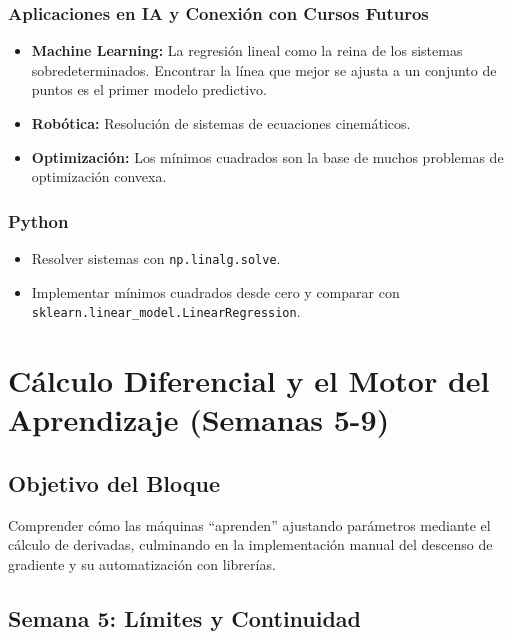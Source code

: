 \documentclass[12pt,a4paper,openany,oneside]{book}
\begin{document}
\subsection{Aplicaciones en IA y Conexión con Cursos Futuros}
\begin{itemize}
    \item \textbf{Machine Learning:} La regresión lineal como la reina de los sistemas sobredeterminados. Encontrar la línea que mejor se ajusta a un conjunto de puntos es el primer modelo predictivo.
    \item \textbf{Robótica:} Resolución de sistemas de ecuaciones cinemáticos.
    \item \textbf{Optimización:} Los mínimos cuadrados son la base de muchos problemas de optimización convexa.
\end{itemize}

\subsection{Python}
\begin{itemize}
    \item Resolver sistemas con \texttt{np.linalg.solve}.
    \item Implementar mínimos cuadrados desde cero y comparar con \texttt{sklearn.linear\_model.LinearRegression}.
\end{itemize}

\chapter{Cálculo Diferencial y el Motor del Aprendizaje (Semanas 5-9)}
\section*{Objetivo del Bloque}
Comprender cómo las máquinas ``aprenden'' ajustando parámetros mediante el cálculo de derivadas, culminando en la implementación manual del descenso de gradiente y su automatización con librerías.

\section{Semana 5: Límites y Continuidad}
\end{document}
